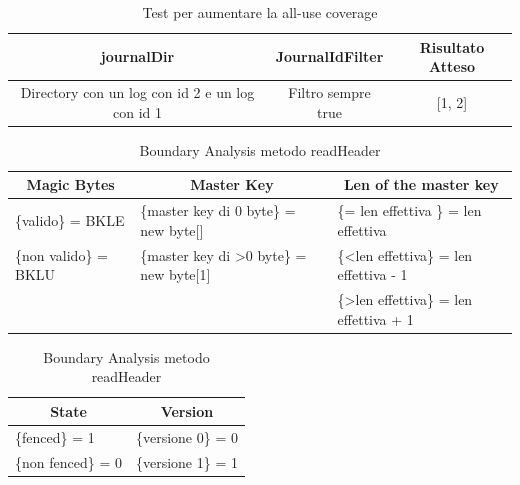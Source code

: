\documentclass[12pt, a4paper]{article}
\begin{document}
  \begin{table}[ht]
    \centering
    \caption[Journal: Test Suite - Adequacy Data Flow 1]{Test per aumentare la all-use coverage}
    \begin{tabular}{|c|c|c|}
      \hline
      journalDir & JournalIdFilter & Risultato Atteso \\
      \hline
      {Directory con un log con id 2 e un log con id 1} & {Filtro sempre true} & [1, 2] \\
      \hline
    \end{tabular}
    \label{tab:ADF2ListJournalIds}
  \end{table}


\begin{table}[ht]
  \centering
  \caption[FileInfo: Boundary Analysis 1]{Boundary Analysis metodo readHeader}
  \begin{tabular}{|l|l|l|}
  \hline
  \multicolumn{1}{|c|}{Magic Bytes} & \multicolumn{1}{|c|}{Master Key} & \multicolumn{1}{|c|}{Len of the master key}\\
  \hline
  \{valido\} = BKLE & \{master key di 0 byte\} = new byte[] & \{= len effettiva \} = len effettiva \\
  \{non valido\} = BKLU  & \{master key di \textgreater 0 byte\} = new byte[1] & \{\textless len effettiva\} = len effettiva - 1 \\
   & & \{\textgreater len effettiva\} = len effettiva + 1 \\
  \hline
  \end{tabular}
  \label{tab:boundaryAnalyisReadHeader1}
\end{table}

\begin{table}[ht]
  \centering
  \caption[FileInfo: Boundary Analysis 2]{Boundary Analysis metodo readHeader}
  \begin{tabular}{|l|l|}
  \hline
  \multicolumn{1}{|c|}{State} & \multicolumn{1}{|c|}{Version} \\
  \hline
  \{fenced\} = 1 & \{versione 0\} = 0 \\
  \{non fenced\} = 0 & \{versione 1\} = 1\\
  \hline
  \end{tabular}
  \label{tab:boundaryAnalyisReadHeader2}
\end{table}
\end{document}
